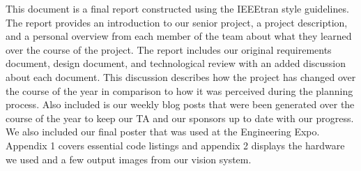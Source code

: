 This document is a final report constructed using the IEEEtran style guidelines. The report provides an introduction to our senior project, a project description, and a personal overview from each member of the team about what they learned over the course of the project. The report includes our original requirements document, design document, and technological review with an added discussion about each document. This discussion describes how the project has changed over the course of the year in comparison to how it was perceived during the planning process. Also included is our weekly blog posts that were been generated over the course of the year to keep our TA and our sponsors up to date with our progress. We also included our final poster that was used at the Engineering Expo. Appendix 1 covers essential code listings and appendix 2 displays the hardware we used and a few output images from our vision system. 
